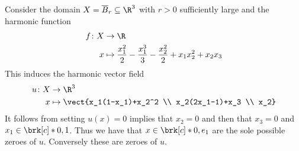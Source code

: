 \begin{example}
  Consider the domain $X=\overline{B}_r\subseteq\R^3$ with $r>0$ sufficiently large and the harmonic function
  \begin{align*}
    f\colon X&\to\R \\
    x&\mapsto \frac{x_1^2}{2}-\frac{x_1^3}{3}-\frac{x_2^2}{2}+x_1x_2^2+x_2x_3
  \end{align*}
  This induces the harmonic vector field
  \begin{align*}
    u\colon X&\to\R^3 \\
    x&\mapsto\vect{x_1(1-x_1)+x_2^2 \\
      x_2(2x_1-1)+x_3 \\
      x_2}
  \end{align*}
  It follows from setting $u(x)=0$ implies that $x_2=0$
  and then that $x_3=0$ and $x_1\in\brk[c]*{0,1}$. Thus we have that $x\in\brk[c]*{0,e_1}$
  are the sole possible zeroes of $u$. Conversely these are zeroes of $u$.


\end{example}
